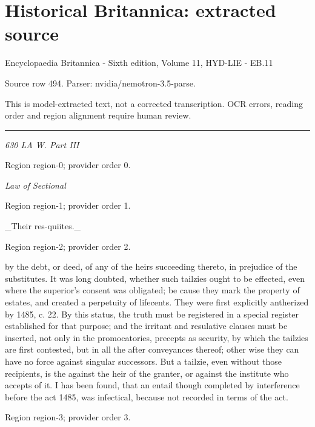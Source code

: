 \documentclass[11pt]{article}
\begin{document}
\section*{Historical Britannica: extracted source}
Encyclopaedia Britannica - Sixth edition, Volume 11, HYD-LIE - EB.11\par
{\small Source row 494. Parser: nvidia/nemotron-3.5-parse.\par}
{\small This is model-extracted text, not a corrected transcription. OCR errors, reading order and region alignment require human review.\par}
\hrule\medskip
{\small\itshape 630 LA W. Part III\par}

{\scriptsize\color{gray} Region region-0; provider order 0.\par}
\medskip

{\small\itshape Law of Sectional\par}

{\scriptsize\color{gray} Region region-1; provider order 1.\par}
\medskip

\_Their res-quiites.\_
\par

{\scriptsize\color{gray} Region region-2; provider order 2.\par}
\medskip

by the debt, or deed, of any of the heirs succeeding thereto, in prejudice of the substitutes. It was long doubted, whether such tailzies ought to be effected, even where the superior’s consent was obligated; be cause they mark the property of estates, and created a perpetuity of lifecents. They were first explicitly antherized by 1485, c. 22. By this status, the truth must be registered in a special register established for that purpose; and the irritant and resulative clauses must be inserted, not only in the promocatories, precepts as security, by which the tailzies are first contested, but in all the after conveyances thereof; other wise they can have no force against singular successors. But a tailzie, even without those recipients, is the against the heir of the granter, or against the institute who accepts of it. I has been found, that an entail though completed by interference before the act 1485, was infectical, because not recorded in terms of the act.
\par

{\scriptsize\color{gray} Region region-3; provider order 3.\par}
\medskip
\end{document}

